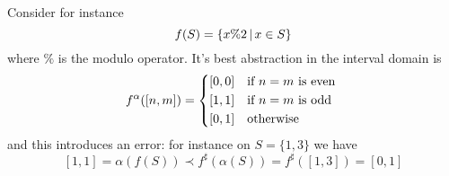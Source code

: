 
\begin{example}
	Consider for instance
	\[
	f(S) = \{ x \% 2 \,\vert\, x \in S \}
	\]
	where $\%$ is the modulo operator.
	It's best abstraction in the interval domain is
	\[
	f^{\alpha}([n, m]) = \begin{cases*}
		[0, 0] &if $n = m$ is even \\
		[1, 1] &if $n = m$ is odd \\
		[0, 1] &otherwise
	\end{cases*}
	\]
	and this introduces an error: for instance on $S = \{ 1, 3 \}$ we have
	\[
	[1, 1] = \alpha(f(S)) \prec f^{\sharp}(\alpha(S)) = f^{\sharp}([1, 3]) = [0, 1]
	\]
\end{example}

